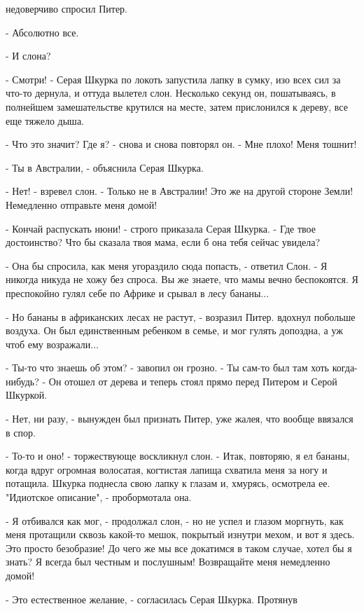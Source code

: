 недоверчиво спросил Питер.
\par- Абсолютно все.
\par- И слона?
\par- Смотри! - Серая Шкурка по локоть запустила лапку в сумку, изо 
всех сил за что-то дернула, и оттуда вылетел слон. Несколько секунд 
он, пошатываясь, в полнейшем замешательстве крутился на месте, затем 
прислонился к дереву, все еще тяжело дыша.
\par- Что это значит? Где я? - снова и снова повторял он. - Мне плохо! 
Меня тошнит!
\par- Ты в Австралии, - объяснила Серая Шкурка.
\par- Нет! - взревел слон. - Только не в Австралии! Это же на другой 
стороне Земли! Немедленно отправьте меня домой!
\par- Кончай распускать нюни! - строго приказала Серая Шкурка. - Где 
твое достоинство? Что бы сказала твоя мама, если б она тебя сейчас 
увидела?
\par- Она бы спросила, как меня угораздило сюда попасть, - ответил 
Слон. - Я никогда никуда не хожу без спроса. Вы же знаете, что мамы 
вечно беспокоятся. Я преспокойно гулял себе по Африке и срывал в лесу 
бананы...
\par- Но бананы в африканских лесах не растут, - возразил Питер.
 вдохнул побольше воздуха. Он был единственным ребенком в 
семье, и мог гулять допоздна, а уж чтоб ему возражали...
\par- Ты-то что знаешь об этом? - завопил он грозно. - Ты сам-то был 
там хоть когда-нибудь? - Он отошел от дерева и теперь стоял прямо 
перед Питером и Серой Шкуркой.
\par- Нет, ни разу, - вынужден был признать Питер, уже жалея, что 
вообще ввязался в спор.
\par- То-то и оно! - торжествующе воскликнул слон. - Итак, повторяю, я 
ел бананы, когда вдруг огромная волосатая, когтистая лапища схватила 
меня за ногу и потащила.
 Шкурка поднесла свою лапку к глазам и, хмурясь, осмотрела 
ее. "Идиотское описание", - пробормотала она.
\par- Я отбивался как мог, - продолжал слон, - но не успел и глазом 
моргнуть, как меня протащили сквозь какой-то мешок, покрытый изнутри 
мехом, и вот я здесь. Это просто безобразие! До чего же мы все 
докатимся в таком случае, хотел бы я знать? Я всегда был честным и 
послушным! Возвращайте меня немедленно домой!
\par- Это естественное желание, - согласилась Серая Шкурка. Протянув 
